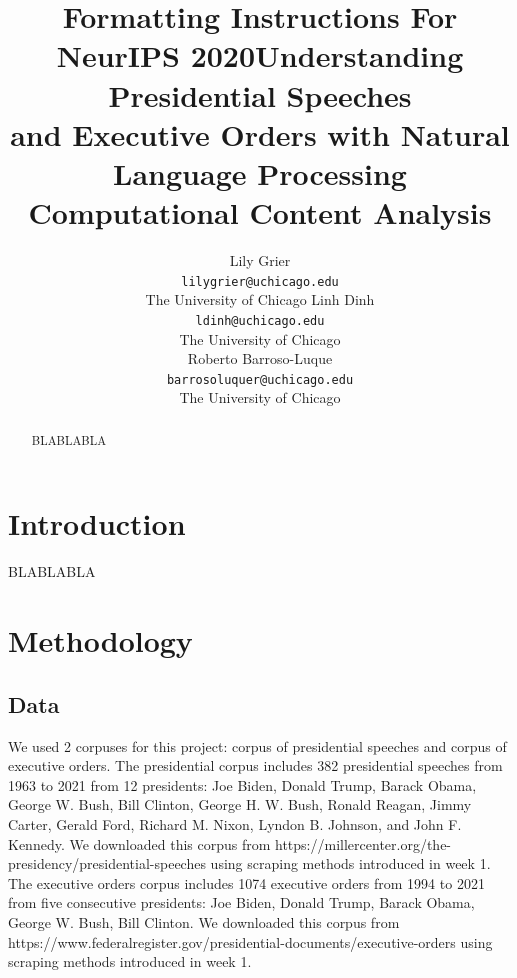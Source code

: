 \documentclass{article}
\title{Formatting Instructions For NeurIPS 2020}
\title{Understanding Presidential Speeches\\ and Executive Orders with Natural Language Processing\\
	\large Computational Content Analysis}
\author{Lily Grier \\
	\texttt{lilygrier@uchicago.edu}  \\
	The University of Chicago
	\AND
	Linh Dinh\\
	\texttt{ldinh@uchicago.edu} \\
    The University of Chicago\\
	\AND
	Roberto Barroso-Luque\\
	\texttt{barrosoluquer@uchicago.edu} \\
	The University of Chicago\\}
\begin{document}
\maketitle

\begin{abstract}{
BLABLABLA }
\end{abstract}

\newpage
\section{Introduction}
BLABLABLA

\section{Methodology}{

\subsection{Data}{We used 2 corpuses for this project: corpus of presidential speeches and corpus of executive orders. The presidential corpus includes 382 presidential speeches from 1963 to 2021 from 12 presidents: Joe Biden, Donald Trump, Barack Obama, George W. Bush, Bill Clinton, George H. W. Bush, Ronald Reagan, Jimmy Carter, Gerald Ford, Richard M. Nixon, Lyndon B. Johnson, and John F. Kennedy. We downloaded this corpus from https://millercenter.org/the-presidency/presidential-speeches using scraping methods introduced in week 1. The executive orders corpus includes 1074 executive orders from 1994 to 2021 from five consecutive presidents: Joe Biden, Donald Trump, Barack Obama, George W. Bush, Bill Clinton. We downloaded this corpus from https://www.federalregister.gov/presidential-documents/executive-orders using scraping methods introduced in week 1. }


}
\end{document}
